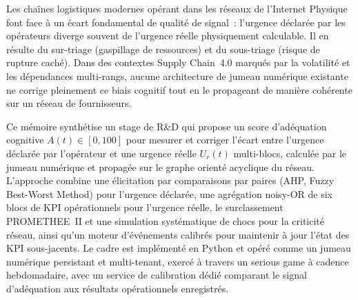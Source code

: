 Les chaînes logistiques modernes opérant dans les réseaux de l'Internet Physique font face à un écart fondamental de qualité de signal~: l'urgence déclarée par les opérateurs diverge souvent de l'urgence réelle physiquement calculable. Il en résulte du sur-triage (gaspillage de ressources) et du sous-triage (risque de rupture caché). Dans des contextes Supply Chain~4.0 marqués par la volatilité et les dépendances multi-rangs, aucune architecture de jumeau numérique existante ne corrige pleinement ce biais cognitif tout en le propageant de manière cohérente sur un réseau de fournisseurs.

Ce mémoire synthétise un stage de R\&D qui propose un score d'adéquation cognitive $A(t) \in [0, 100]$ pour mesurer et corriger l'écart entre l'urgence déclarée par l'opérateur et une urgence réelle $U_r(t)$ multi-blocs, calculée par le jumeau numérique et propagée sur le graphe orienté acyclique du réseau. L'approche combine une élicitation par comparaisons par paires (AHP, Fuzzy Best-Worst Method) pour l'urgence déclarée, une agrégation noisy-OR de six blocs de KPI opérationnels pour l'urgence réelle, le surclassement PROMETHEE~II et une simulation systématique de chocs pour la criticité réseau, ainsi qu'un moteur d'événements calibrés pour maintenir à jour l'état des KPI sous-jacents. Le cadre est implémenté en Python et opéré comme un jumeau numérique persistant et multi-tenant, exercé à travers un serious game à cadence hebdomadaire, avec un service de calibration dédié comparant le signal d'adéquation aux résultats opérationnels enregistrés.
